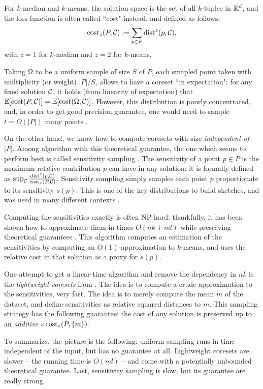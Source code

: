 For $k$-median and $k$-means, the solution space is the set of all $k$-tuples in $\mathbb{R}^d$, and the loss function is often called ``cost" instead, and defined as follows:
\[\operatorname{cost}_z(P, \mathcal C) := \sum_{p \in P} \operatorname{dist}^z(p, \mathcal C),\]
with $z=1$ for $k$-median and $z=2$ for $k$-means.

Taking $\Omega$ to be a uniform sample of size $S$ of $P$, each smapled point taken with multiplicity (or weight) $|P|/S$, allows to have a coreset ``in expectation": for any fixed solution $\mathcal C$, it holds (from linearity of expectation) that $\mathbb{E}[\operatorname{cost}(P, \mathcal C)] = \mathbb{E}[\operatorname{cost}(\Omega, \mathcal C)]$. However, this distribution is poorly concentrated, and, in order to get good precision guarantee, one would need to sample $t = \Omega(|P|)$ many points \cite{bachem2017practical}. 


On the other hand, we know how to compute coresets with size \textit{independent of $|P|$}. Among algorithm with this theoretical guarantee, the one which seems to perform best is called sensitivity sampling \cite{chrisESA}. 
The sensitivity of a point $p \in P$ is the maximum relative contribution $p$ can have in any solution: it is formally defined as $\sup_{\mathcal C} \frac{\operatorname{dist}^z(p, \mathcal C)}{\operatorname{cost}_z(P, \mathcal C)}$. 
Sensitivity sampling simply samples each point $p$ proportionate to its sensitivity $s(p)$. This is one of the key distributions to build sketches, and was used in many different contexts \cite{FeldmanL11, CohenP15}.

Computing the sensitivities exactly is often NP-hard: thankfully, it has been shown how to approximate them in times $O(nk+nd)$ while preserving theoretical guarantees \cite{varadarajan12,FeldmanL11}. 
This algorithm computes an estimation of the sensitivities by computing an $O(1)$-approximation to $k$-means, and uses the relative cost in that solution as a proxy for $s(p)$.


One attempt to get a linear-time algorithm and remove the dependency in $nk$ is the \emph{lightweight coresets} from \cite{bachem2018scalable}. The idea is to compute a crude approximation to the sensitivities, very fast. The idea is to merely compute the mean $m$ of the dataset, and define sensitivities as relative squared distances to $m$. This sampling strategy has the following guarantee: the cost of any solution is preserved up to an \textit{additive} $\varepsilon \operatorname{cost}_z(P, \{m\})$.

To summarize, the picture is the following: uniform sampling runs in time independent of the input, but has no guarantee at all. Lightweight coresets are slower -- the running time is $O(nd)$ -- and come with a potentially unbounded theoretical guarantee. Last, sensitivity sampling is slow, but its guarantee are really strong.
 
